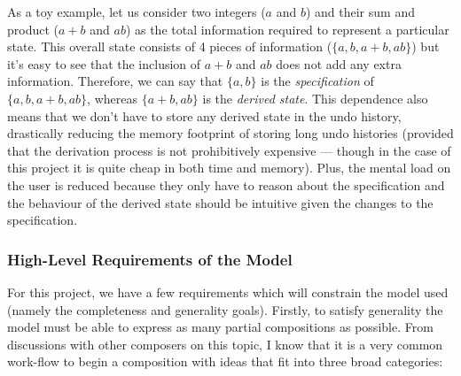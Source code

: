 \documentclass[12pt]{article}
\begin{document}
As a toy example, let us consider two integers ($a$ and $b$) and their sum and product ($a + b$ and
$ab$) as the total information required to represent a particular state.  This overall state
consists of 4 pieces of information ($\{a, b, a + b, ab\}$) but it's easy to see that the inclusion
of $a + b$ and $ab$ does not add any extra information.  Therefore, we can say that $\{a, b\}$ is
the \emph{specification} of $\{a, b, a + b, ab\}$, whereas $\{a + b, ab\}$ is the \emph{derived
state}.  This dependence also means that we don't have to store any derived state in the undo
history, drastically reducing the memory footprint of storing long undo histories (provided that the
derivation process is not prohibitively expensive --- though in the case of this project it is quite
cheap in both time and memory).  Plus, the mental load on the user is reduced because they only have
to reason about the specification and the behaviour of the derived state should be intuitive given
the changes to the specification.

\subsubsection{High-Level Requirements of the Model}

For this project, we have a few requirements which will constrain the model used (namely the
completeness and generality goals).  Firstly, to satisfy generality the model must be able to
express as many partial compositions as possible.  From discussions with other composers on this
topic, I know that it is a very common work-flow to begin a composition with ideas that fit into
three broad categories:
\end{document}
